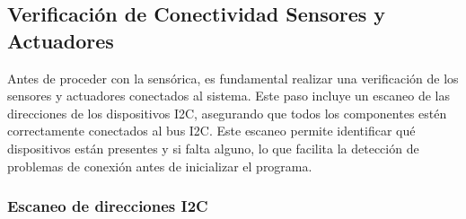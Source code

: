     \subsection{Verificación de Conectividad Sensores y Actuadores }
        \vspace{5px}

        Antes de proceder con la sensórica, es fundamental realizar una verificación de los sensores y actuadores conectados al sistema. Este paso incluye un escaneo de las direcciones de los dispositivos I2C, asegurando que todos los componentes estén correctamente conectados al bus I2C. Este escaneo permite identificar qué dispositivos están presentes y si falta alguno, lo que facilita la detección de problemas de conexión antes de inicializar el programa.\vspace{5px}

        \subsubsection{Escaneo de direcciones I2C} 
        \vspace{5px}

